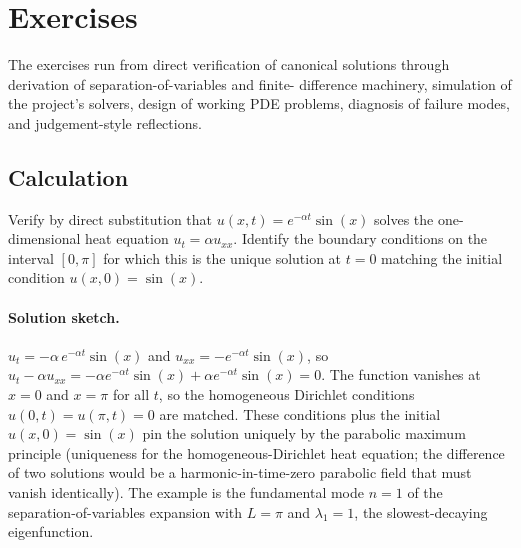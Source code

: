 \section{Exercises}

The exercises run from direct verification of canonical solutions
through derivation of separation-of-variables and finite-
difference machinery, simulation of the project's solvers,
design of working PDE problems, diagnosis of failure modes, and
judgement-style reflections.

\subsection*{Calculation}

\begin{exercise}
Verify by direct substitution that $u(x, t) = e^{-\alpha t}
\sin(x)$ solves the one-dimensional heat equation $u_{t} = \alpha
u_{xx}$. Identify the boundary conditions on the interval $[0,
\pi]$ for which this is the unique solution at $t = 0$ matching
the initial condition $u(x, 0) = \sin(x)$.

\paragraph{Solution sketch.}
$u_{t} = -\alpha\, e^{-\alpha t}\sin(x)$ and $u_{xx} = -e^{-\alpha
t}\sin(x)$, so $u_{t} - \alpha u_{xx} = -\alpha e^{-\alpha t}
\sin(x) + \alpha e^{-\alpha t}\sin(x) = 0$. The function vanishes
at $x = 0$ and $x = \pi$ for all $t$, so the homogeneous Dirichlet
conditions $u(0, t) = u(\pi, t) = 0$ are matched. These conditions
plus the initial $u(x, 0) = \sin(x)$ pin the solution uniquely by
the parabolic maximum principle (uniqueness for the
homogeneous-Dirichlet heat equation; the difference of two
solutions would be a harmonic-in-time-zero parabolic field that
must vanish identically). The example is the fundamental mode
$n = 1$ of the separation-of-variables expansion with $L = \pi$
and $\lambda_{1} = 1$, the slowest-decaying eigenfunction.
\end{exercise}

